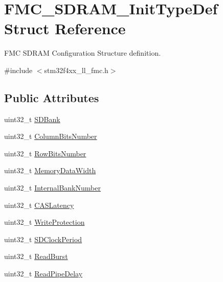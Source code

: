 \hypertarget{struct_f_m_c___s_d_r_a_m___init_type_def}{}\section{F\+M\+C\+\_\+\+S\+D\+R\+A\+M\+\_\+\+Init\+Type\+Def Struct Reference}
\label{struct_f_m_c___s_d_r_a_m___init_type_def}


F\+MC S\+D\+R\+AM Configuration Structure definition.  




{\ttfamily \#include $<$stm32f4xx\+\_\+ll\+\_\+fmc.\+h$>$}

\subsection*{Public Attributes}
\begin{DoxyCompactItemize}
\item 
uint32\+\_\+t \hyperlink{struct_f_m_c___s_d_r_a_m___init_type_def_aea667abcdef2269338f2172c9b23e0be}{S\+D\+Bank}
\item 
uint32\+\_\+t \hyperlink{struct_f_m_c___s_d_r_a_m___init_type_def_a2c498d704e18f17cc41c6e1e50d45447}{Column\+Bits\+Number}
\item 
uint32\+\_\+t \hyperlink{struct_f_m_c___s_d_r_a_m___init_type_def_a8a7f54fd1e3b04c566a76b774d00adda}{Row\+Bits\+Number}
\item 
uint32\+\_\+t \hyperlink{struct_f_m_c___s_d_r_a_m___init_type_def_a370d52e3c7296bd5d4d65344928af04c}{Memory\+Data\+Width}
\item 
uint32\+\_\+t \hyperlink{struct_f_m_c___s_d_r_a_m___init_type_def_a11bcccbe5190e20eb00b2e07d9a16401}{Internal\+Bank\+Number}
\item 
uint32\+\_\+t \hyperlink{struct_f_m_c___s_d_r_a_m___init_type_def_aa55520658496327bbc831183b8dead9e}{C\+A\+S\+Latency}
\item 
uint32\+\_\+t \hyperlink{struct_f_m_c___s_d_r_a_m___init_type_def_a5baf22e72bd710a0522b0814723f518d}{Write\+Protection}
\item 
uint32\+\_\+t \hyperlink{struct_f_m_c___s_d_r_a_m___init_type_def_af7845a58e91f2166717b2f7f15d14dbb}{S\+D\+Clock\+Period}
\item 
uint32\+\_\+t \hyperlink{struct_f_m_c___s_d_r_a_m___init_type_def_aba6b0f5c64dc6d68a4a5dbe5c7511c4f}{Read\+Burst}
\item 
uint32\+\_\+t \hyperlink{struct_f_m_c___s_d_r_a_m___init_type_def_a3513cfd5140bd410cef2f0015c5a3733}{Read\+Pipe\+Delay}
\end{DoxyCompactItemize}



